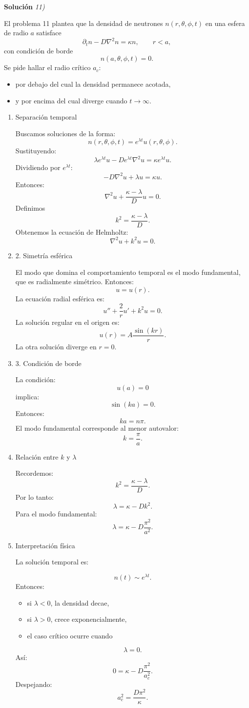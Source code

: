 \documentclass[11pt,spanish]{article}
\newcounter{problema}
\begin{document}
\vspace{0.5cm}
{\bf Soluci\'on }{\em 11)}
\vspace{0.5cm}

El problema 11 plantea que la densidad de neutrones $n(r,\theta,\phi,t)$ en una esfera de radio $a$ satisface
$$
\partial_t n-D\nabla^2 n=\kappa n,
\qquad r<a,
$$
con condición de borde
$$
n(a,\theta,\phi,t)=0.
$$
Se pide hallar el radio crítico $a_c$:
\begin{itemize}
\item por debajo del cual la densidad permanece acotada,
\item y por encima del cual diverge cuando $t\to\infty$.
\end{itemize}

\begin{enumerate}
\item Separación temporal

Buscamos soluciones de la forma:
$$
n(r,\theta,\phi,t)=e^{\lambda t}u(r,\theta,\phi).
$$
Sustituyendo:
$$
\lambda e^{\lambda t}u-D e^{\lambda t}\nabla^2 u
=
\kappa e^{\lambda t}u.
$$
Dividiendo por $e^{\lambda t}$:
$$
-D\nabla^2 u+\lambda u=\kappa u.
$$
Entonces:
$$
\nabla^2 u+\frac{\kappa-\lambda}{D}u=0.
$$
Definimos
$$
k^2=\frac{\kappa-\lambda}{D}.
$$
Obtenemos la ecuación de Helmholtz:
$$
\nabla^2 u+k^2u=0.
$$

\item2. Simetría esférica

El modo que domina el comportamiento temporal es el modo fundamental, que es radialmente simétrico.
Entonces:
$$
u=u(r).
$$
La ecuación radial esférica es:
$$
u''+\frac2r u'+k^2u=0.
$$
La solución regular en el origen es:
$$
u(r)=A\frac{\sin(kr)}{r}.
$$
La otra solución diverge en $r=0$.

\item3. Condición de borde

La condición:
$$
u(a)=0
$$
implica:
$$
\sin(ka)=0.
$$
Entonces:
$$
ka=n\pi.
$$
El modo fundamental corresponde al menor autovalor:
$$
k=\frac{\pi}{a}.
$$

\item Relación entre $k$ y $\lambda$

Recordemos:
$$
k^2=\frac{\kappa-\lambda}{D}.
$$
Por lo tanto:
$$
\lambda
=
\kappa-Dk^2.
$$
Para el modo fundamental:
$$
\lambda
=
\kappa-D\frac{\pi^2}{a^2}.
$$

\item Interpretación física

La solución temporal es:

$$
n(t)\sim e^{\lambda t}.
$$
Entonces:
\begin{itemize}
\item si $\lambda<0$, la densidad decae,
\item si $\lambda>0$, crece exponencialmente,
\item el caso crítico ocurre cuando
\end{itemize}
$$
\lambda=0.
$$
Así:
$$
0=
\kappa-D\frac{\pi^2}{a_c^2}.
$$
Despejando:
$$
a_c^2=
\frac{D\pi^2}{\kappa}.
$$


\end{enumerate}
\end{document}
